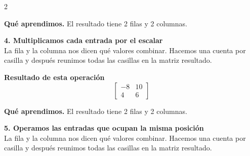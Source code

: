 \documentclass[11pt,a4paper,landscape]{article}
\begin{document}
\begin{multicols*}{2}
\begin{minipage}{\linewidth}
\par\smallskip\textbf{Qué aprendimos.} El resultado tiene 2 filas y 2 columnas.
\end{minipage}\par\medskip
\noindent\begin{minipage}{\linewidth}\textbf{4. Multiplicamos cada entrada por el escalar}\\[2pt]La fila y la columna nos dicen qué valores combinar. Hacemos una cuenta por casilla y después reunimos todas las casillas en la matriz resultado.
\par{}\par\smallskip
\par\smallskip \textbf{Resultado de esta operación}\[\begin{bmatrix}-8 & 10\\4 & 6\end{bmatrix}\]
\par\smallskip\textbf{Qué aprendimos.} El resultado tiene 2 filas y 2 columnas.
\end{minipage}\par\medskip
\noindent\begin{minipage}{\linewidth}\textbf{5. Operamos las entradas que ocupan la misma posición}\\[2pt]La fila y la columna nos dicen qué valores combinar. Hacemos una cuenta por casilla y después reunimos todas las casillas en la matriz resultado.
\par{}\par\smallskip

\end{minipage}
\end{multicols*}
\end{document}
